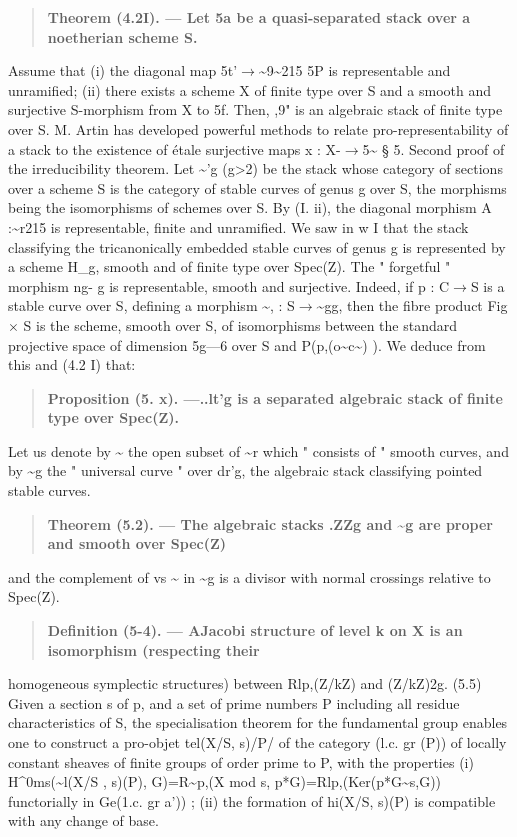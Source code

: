 \documentclass[11pt]{article}
\theoremstyle{plain}
\theoremstyle{definition}
\theoremstyle{remark}
\begin{document}
\begin{quote}\textbf{Theorem (4.2I). --- Let 5a be a quasi-separated stack over a noetherian scheme S.}\end{quote}
Assume that (i) the diagonal map 5t'$\to$\textasciitilde{}9\textasciitilde{}215 5P is representable and unramified; (ii) there exists a scheme X of finite type over S and a smooth and surjective S-morphism from X to 5f. Then, ,9" is an algebraic stack of finite type over S. M. Artin has developed powerful methods to relate pro-representability of a stack to the existence of \'etale surjective maps x : X-$\to$5\textasciitilde{} § 5. Second proof of the irreducibility theorem. Let \textasciitilde{}'g (g>2) be the stack whose category of sections over a scheme S is the category of stable curves of genus g over S, the morphisms being the isomorphisms of schemes over S. By (I. ii), the diagonal morphism A :\textasciitilde{}r215 is representable, finite and unramified. We saw in w I that the stack classifying the tricanonically embedded stable curves of genus g is represented by a scheme H\_g, smooth and of finite type over Spec(Z). The " forgetful " morphism ng- g is representable, smooth and surjective. Indeed, if p : C$\to$S is a stable curve over S, defining a morphism \textasciitilde{}, : S$\to$\textasciitilde{}gg, then the fibre product Fig $\times$ S is the scheme, smooth over S, of isomorphisms between the standard projective space of dimension 5g---6 over S and P(p,(o\textasciitilde{}c\textasciitilde{}) ). We deduce from this and (4.2 I) that:

\begin{quote}\textbf{Proposition (5. x). ---..lt'g is a separated algebraic stack of finite type over Spec(Z).}\end{quote}
Let us denote by \textasciitilde{} the open subset of \textasciitilde{}r which " consists of " smooth curves, and by \textasciitilde{}g the " universal curve " over dr'g, the algebraic stack classifying pointed stable curves.

\begin{quote}\textbf{Theorem (5.2). --- The algebraic stacks .ZZg and \textasciitilde{}g are proper and smooth over Spec(Z)}\end{quote}
and the complement of vs \textasciitilde{} in \textasciitilde{}g is a divisor with normal crossings relative to Spec(Z).

\begin{quote}\textbf{Definition (5-4). --- AJacobi structure of level k on X is an isomorphism (respecting their}\end{quote}
homogeneous symplectic structures) between Rlp,(Z/kZ) and (Z/kZ)2g. (5.5) Given a section s of p, and a set of prime numbers P including all residue characteristics of S, the specialisation theorem for the fundamental group enables one to construct a pro-objet tel(X/S, s)/P/ of the category (l.c. gr (P)) of locally constant sheaves of finite groups of order prime to P, with the properties (i) H\textasciicircum{}0ms(\textasciitilde{}l(X/S , s)(P), G)=R\textasciitilde{}p,(X mod s, p*G)=Rlp,(Ker(p*G\textasciitilde{}s,G)) functorially in Ge(1.c. gr a')) ; (ii) the formation of hi(X/S, s)(P) is compatible with any change of base.
\end{document}
